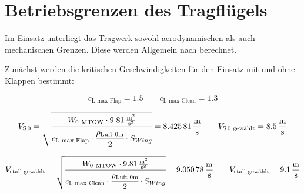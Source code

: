 

\label{Resultierende Kräfte und Momenten Kritisch}

\clearpage

\section{Betriebsgrenzen des Tragflügels}

Im Einsatz unterliegt das Tragwerk sowohl aerodynamischen als auch mechanischen Grenzen.
Diese werden Allgemein nach \cite{Sperl2011} berechnet.

Zunächst werden die kritischen Geschwindigkeiten für den Einsatz mit und ohne Klappen bestimmt:

\begin{equation}
\label{eq:K4}
c_{\text{L\ max\ Flap}} = 1.5 \qquad c_{\text{L\ max\ Clean}} = 1.3 
\end{equation}

\begin{equation}
\label{eq:K5}
V_{\text{S\,0}} = \sqrt{\cfrac{W_{0\ \text{MTOW}} \cdot \SI[per-mode = fraction]{9,81}{\meter\squared\per\second\squared}}{c_{\text{L\ max\ Flap}} \cdot \cfrac{\rho_{\text{Luft\ 0m}}}{2} \cdot S_{Wing}}}=\SI[per-mode = fraction]{8,42581}{\meter\per\second} \qquad V_{\text{S\,0\ gewählt}}=\SI[per-mode = fraction]{8,5}{\meter\per\second}
\end{equation}

\begin{equation}
\label{eq:K6}
V_{\text{stall\ gewählt}} = \sqrt{\cfrac{W_{0\ \text{MTOW}} \cdot \SI[per-mode = fraction]{9,81}{\meter\squared\per\second\squared}}{c_{\text{L\ max\ Clean}} \cdot \cfrac{\rho_{\text{Luft\ 0m}}}{2} \cdot S_{Wing}}}=\SI[per-mode = fraction]{9,05078}{\meter\per\second} \qquad V_{\text{stall\ gewählt}}=\SI[per-mode = fraction]{9,1}{\meter\per\second}
\end{equation}



